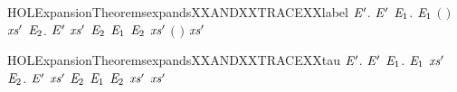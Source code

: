\begin{SaveVerbatim}{HOLExpansionTheoremsexpandsXXANDXXTRACEXXlabel}
\HOLTokenTurnstile{} \HOLSymConst{\HOLTokenForall{}} \ensuremath{\HOLBoundVar{E}\sp{\prime}}.
         \ensuremath{\HOLBoundVar{E}\sp{\prime}} \HOLSymConst{\HOLTokenImp{}}
       \HOLSymConst{\HOLTokenForall{}}  \ensuremath{\HOLBoundVar{E}\sb{\mathrm{1}}}.
              \ensuremath{\HOLBoundVar{E}\sb{\mathrm{1}}} \HOLSymConst{\HOLTokenConj{}}  \ensuremath{(} \ensuremath{)}  \HOLSymConst{\HOLTokenImp{}}
           \HOLSymConst{\HOLTokenExists{}}\ensuremath{\HOLBoundVar{xs}\sp{\prime}} \ensuremath{\HOLBoundVar{E}\sb{\mathrm{2}}}.
                \ensuremath{\HOLBoundVar{E}\sp{\prime}} \ensuremath{\HOLBoundVar{xs}\sp{\prime}} \ensuremath{\HOLBoundVar{E}\sb{\mathrm{2}}} \HOLSymConst{\HOLTokenConj{}} \ensuremath{\HOLBoundVar{E}\sb{\mathrm{1}}}  \ensuremath{\HOLBoundVar{E}\sb{\mathrm{2}}} \HOLSymConst{\HOLTokenConj{}}
                \ensuremath{\HOLBoundVar{xs}\sp{\prime}} \HOLSymConst{\HOLTokenLeq{}}   \HOLSymConst{\HOLTokenConj{}}
                \ensuremath{(} \ensuremath{)} \ensuremath{\HOLBoundVar{xs}\sp{\prime}}
\end{SaveVerbatim}
\newcommand{\HOLExpansionTheoremsexpandsXXANDXXTRACEXXlabel}{\UseVerbatim{HOLExpansionTheoremsexpandsXXANDXXTRACEXXlabel}}
\begin{SaveVerbatim}{HOLExpansionTheoremsexpandsXXANDXXTRACEXXtau}
\HOLTokenTurnstile{} \HOLSymConst{\HOLTokenForall{}} \ensuremath{\HOLBoundVar{E}\sp{\prime}}.
         \ensuremath{\HOLBoundVar{E}\sp{\prime}} \HOLSymConst{\HOLTokenImp{}}
       \HOLSymConst{\HOLTokenForall{}}  \ensuremath{\HOLBoundVar{E}\sb{\mathrm{1}}}.
              \ensuremath{\HOLBoundVar{E}\sb{\mathrm{1}}} \HOLSymConst{\HOLTokenConj{}}   \HOLSymConst{\HOLTokenImp{}}
           \HOLSymConst{\HOLTokenExists{}}\ensuremath{\HOLBoundVar{xs}\sp{\prime}} \ensuremath{\HOLBoundVar{E}\sb{\mathrm{2}}}.
                \ensuremath{\HOLBoundVar{E}\sp{\prime}} \ensuremath{\HOLBoundVar{xs}\sp{\prime}} \ensuremath{\HOLBoundVar{E}\sb{\mathrm{2}}} \HOLSymConst{\HOLTokenConj{}} \ensuremath{\HOLBoundVar{E}\sb{\mathrm{1}}}  \ensuremath{\HOLBoundVar{E}\sb{\mathrm{2}}} \HOLSymConst{\HOLTokenConj{}}
                \ensuremath{\HOLBoundVar{xs}\sp{\prime}} \HOLSymConst{\HOLTokenLeq{}}   \HOLSymConst{\HOLTokenConj{}}  \ensuremath{\HOLBoundVar{xs}\sp{\prime}}
\end{SaveVerbatim}
